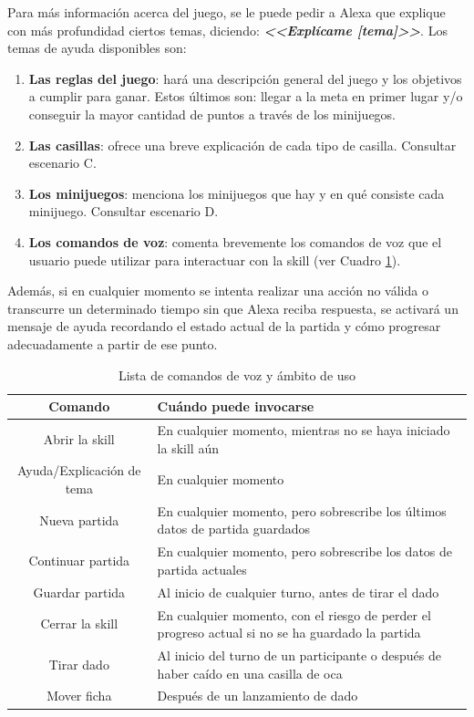 Para más información acerca del juego, se le puede pedir a Alexa que explique con más profundidad ciertos temas, diciendo: \textbf{\textit{<<Explícame [tema]>>}}. Los temas de ayuda disponibles son: 
\begin{enumerate}
	\item \textbf{Las reglas del juego}: hará una descripción general del juego y los objetivos a cumplir para ganar. Estos últimos son: llegar a la meta en primer lugar y/o conseguir la mayor cantidad de puntos a través de los minijuegos.
	\item \textbf{Las casillas}: ofrece una breve explicación de cada tipo de casilla. Consultar escenario C.
	\item \textbf{Los minijuegos}: menciona los minijuegos que hay y en qué consiste cada minijuego. Consultar escenario D.
	\item \textbf{Los comandos de voz}: comenta brevemente los comandos de voz que el usuario puede utilizar para interactuar con la skill (ver Cuadro \ref{tab:comandos-voz}).
\end{enumerate}

Además, si en cualquier momento se intenta realizar una acción no válida o transcurre un determinado tiempo sin que Alexa reciba respuesta, se activará un mensaje de ayuda recordando el estado actual de la partida y cómo progresar adecuadamente a partir de ese punto.

\begin{table}[H]
	\centering
	\begin{tabular}{|c|p{8.5cm}|}
		\hline
		\rowcolor{lightgray}
		\textbf{Comando} & \textbf{Cuándo puede invocarse}\\
		\hline
		Abrir la skill & En cualquier momento, mientras no se haya iniciado la skill aún \\
		\hline
		Ayuda/Explicación de tema & En cualquier momento \\
		\hline
		Nueva partida & En cualquier momento, pero sobrescribe los últimos datos de partida guardados \\
		\hline
		Continuar partida & En cualquier momento, pero sobrescribe los datos de partida actuales \\
		\hline
		Guardar partida & Al inicio de cualquier turno, antes de tirar el dado \\
		\hline
		Cerrar la skill & En cualquier momento, con el riesgo de perder el progreso actual si no se ha guardado la partida \\
		\hline
		Tirar dado & Al inicio del turno de un participante o después de haber caído en una casilla de oca \\
		\hline
		Mover ficha & Después de un lanzamiento de dado \\
		\hline
	\end{tabular}
	\caption{Lista de comandos de voz y ámbito de uso}
	\label{tab:comandos-voz}
\end{table}

